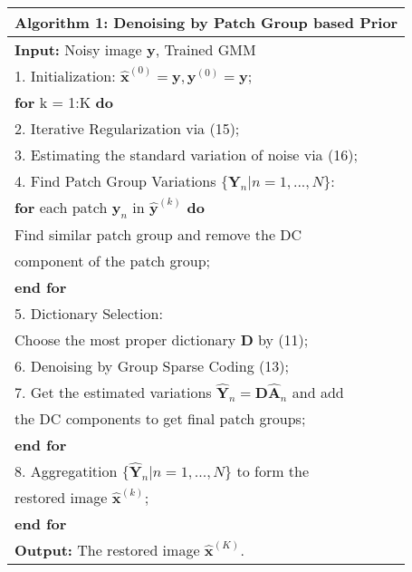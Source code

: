 \documentclass[10pt,twocolumn,letterpaper]{article}
\begin{document}
\begin{table}\label{a1}
\begin{tabular}{l}
\hline
\textbf{Algorithm 1}: Denoising by Patch Group based Prior
\\
\hline
\textbf{Input:} Noisy image $\mathbf{y}$, Trained GMM
\\
1. Initialization: $\hat{\mathbf{x}}^{(0)}=\mathbf{y},\mathbf{y}^{(0)}=\mathbf{y}$;
\\
\textbf{for} k = 1:K \textbf{do}
\\
2. Iterative Regularization via (15);
\\
3. Estimating the standard variation of noise via (16);
\\
4. Find Patch Group Variations $\{\mathbf{Y}_{n}|n=1,...,N\}$: 
\\
\quad\quad \textbf{for} each patch $\mathbf{y}_{n}$ in $\hat{\mathbf{y}}^{(k)}$ \textbf{do}
\\
\quad\quad\quad Find similar patch group and remove the DC
\\
\quad\quad\quad component of the patch group;%
\\
\quad\quad\textbf{end for}
\\
5. Dictionary Selection: 
\\
\quad\quad Choose the most proper dictionary $\mathbf{D}$ by (11);
\\
6. Denoising by Group Sparse Coding (13);
\\
7. Get the estimated variations $\hat{\mathbf{Y}}_{n}=\mathbf{D}\hat{\mathbf{A}}_{n}$ and add
\\
\quad the DC components to get final patch groups;
\\
\textbf{end for}
\\
8. Aggregatition $\{\hat{\mathbf{Y}}_{n}|n=1,...,N\}$ to form the 
\\
\quad restored image $\hat{\mathbf{x}}^{(k)}$;
\\
\textbf{end for}
\\
\textbf{Output:} The restored image $\hat{\mathbf{x}}^{(K)}$.\\
\hline
\end{tabular}
\end{table}
\end{document}
